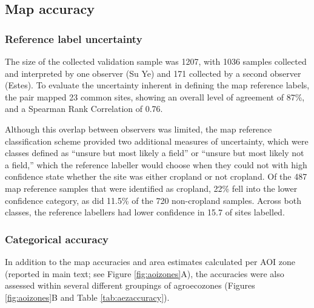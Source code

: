 \documentclass[
  11pt,
  a4paper]{article}
\begin{document}
\hypertarget{map-accuracy}{%
\subsection{Map accuracy}\label{map-accuracy}}

\hypertarget{reference-label-uncertainty}{%
\subsubsection{Reference label
uncertainty}\label{reference-label-uncertainty}}

The size of the collected validation sample was 1207, with 1036 samples
collected and interpreted by one observer (Su Ye) and 171 collected by a
second observer (Estes). To evaluate the uncertainty inherent in
defining the map reference labels, the pair mapped 23 common sites,
showing an overall level of agreement of 87\%, and a Spearman Rank
Correlation of 0.76.

Although this overlap between observers was limited, the map reference
classification scheme provided two additional measures of uncertainty,
which were classes defined as ``unsure but most likely a field'' or
``unsure but most likely not a field,'' which the reference labeller
would choose when they could not with high confidence state whether the
site was either cropland or not cropland. Of the 487 map reference
samples that were identified as cropland, 22\% fell into the lower
confidence category, as did 11.5\% of the 720 non-cropland samples.
Across both classes, the reference labellers had lower confidence in
15.7 of sites labelled.

\hypertarget{categorical-accuracy}{%
\subsubsection{Categorical accuracy}\label{categorical-accuracy}}

In addition to the map accuracies and area estimates calculated per AOI
zone (reported in main text; see Figure \ref{fig:aoizones}A), the
accuracies were also assessed within several different groupings of
agroecozones (Figures \ref{fig:aoizones}B and Table
\ref{tab:aezaccuracy}).
\end{document}
